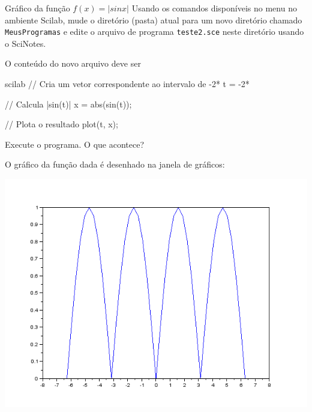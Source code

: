 \documentclass[11pt,fleqn]{practice}
\begin{document}
\begin{task}{Gráfico da função $f(x) = |sin x|$}{}
  Usando os comandos disponíveis no menu no ambiente Scilab, mude o
  diretório (pasta) atual para um novo diretório chamado
  \texttt{MeusProgramas} e edite o arquivo de programa
  \texttt{teste2.sce} neste diretório usando o SciNotes.

  O conteúdo do novo arquivo deve ser
  \begin{lst}{scilab}
// Cria um vetor correspondente ao intervalo de -2*%
t = -2*%

// Calcula |sin(t)|
x = abs(sin(t));

// Plota o resultado
plot(t, x);
  \end{lst}

  Execute o programa. O que acontece?

  \tcblower
  \solution
  O gráfico da função dada é desenhado na janela de gráficos:
  \begin{center}
    \includegraphics[width=\linewidth]{images/grafico2}
  \end{center}
\end{task}
\end{document}
